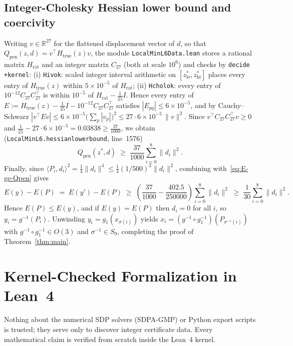 \documentclass[11pt,reqno]{amsart}
\renewcommand{\_}{\origunderscore\allowbreak}
\theoremstyle{definition}
\newcommand{\R}{\mathbb{R}}
\newcommand{\ip}[2]{\langle #1, #2 \rangle}
\newcommand{\norm}[1]{\lVert #1 \rVert}
\begin{document}
\subsection{Integer-Cholesky Hessian lower bound and coercivity}\label{subsec:hessian}
Writing $v \in \R^{27}$ for the flattened displacement vector of $d$, so that $Q_{\mathrm{pen}}(z, d) = v^\top H_{\mathrm{true}}(z) v$, the module \texttt{LocalMinL6Data.lean} stores a rational matrix $H_{\mathrm{rat}}$ and an integer matrix $C_{27}$ (both at scale $10^6$) and checks by \texttt{decide +kernel}: (i) \texttt{H\_iv\_ok}: scaled integer interval arithmetic on $[z^*_{\mathrm{lo}}, z^*_{\mathrm{hi}}]$ places every entry of $H_{\mathrm{true}}(z)$ within $5\times 10^{-5}$ of $H_{\mathrm{rat}}$; (ii) \texttt{H\_chol\_ok}: every entry of $10^{-12}C_{27}C_{27}^\top$ is within $10^{-5}$ of $H_{\mathrm{rat}} - \frac{1}{25} I$. Hence every entry of $E := H_{\mathrm{true}}(z) - \frac{1}{25}I - 10^{-12}C_{27}C_{27}^\top$ satisfies $|E_{pq}| \le 6\times 10^{-5}$, and by Cauchy--Schwarz $|v^\top E v| \le 6\times 10^{-5}\bigl(\sum_p |v_p|\bigr)^2 \le 27\cdot 6\times 10^{-5}\,\norm{v}^2$.
Since $v^\top C_{27}C_{27}^\top v \ge 0$ and $\frac{1}{25} - 27\cdot 6\times 10^{-5} = 0.03838 \ge \frac{37}{1000}$, we obtain (\texttt{LocalMinL6.hessian\_lower\_bound}, line~1576)
\[
  Q_{\mathrm{pen}}(z^*, d) \;\ge\; \frac{37}{1000} \sum_{i=0}^8 \norm{d_i}^2.
\]
Finally, since $\ip{P_i}{d_i}^2 = \frac{1}{4}\norm{d_i}^4 \le \frac{1}{4}(1/500)^2\norm{d_i}^2$, combining with~\eqref{eq:E-ge-Qpen} gives
\[
  E(y) - E(P) \;=\; E(y') - E(P) \;\ge\; \left(\frac{37}{1000} - \frac{402.5}{250000}\right)\sum_{i=0}^8 \norm{d_i}^2
  \;\ge\; \frac{1}{30}\sum_{i=0}^8 \norm{d_i}^2.
\]
Hence $E(P) \le E(y)$, and if $E(y) = E(P)$ then $d_i = 0$ for all $i$, so $y_i = g^{-1}(P_i)$.
Unwinding $y_i = g_1(x_{\sigma(i)})$ yields $x_i = (g^{-1} \circ g_1^{-1})(P_{\sigma^{-1}(i)})$ with $g^{-1} \circ g_1^{-1} \in O(3)$ and $\sigma^{-1} \in S_9$, completing the proof of Theorem~\ref{thm:main}.

\section{Kernel-Checked Formalization in Lean~4}\label{sec:lean}

Nothing about the numerical SDP solvers (SDPA-GMP) or Python export scripts is trusted; they serve only to discover integer certificate data. Every mathematical claim is verified from scratch inside the Lean~4 kernel.
\end{document}
